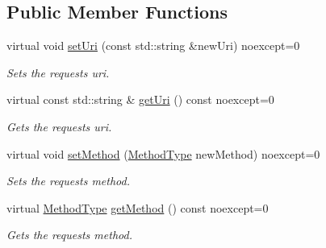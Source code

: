 \subsection*{Public Member Functions}
\begin{DoxyCompactItemize}
\item 
\mbox{\label{classZiApi_1_1HttpRequest_a0a6e036d520b4c43a7350f465c429b20}} 
virtual void \mbox{\hyperlink{classZiApi_1_1HttpRequest_a0a6e036d520b4c43a7350f465c429b20}{set\+Uri}} (const std\+::string \&new\+Uri) noexcept=0
\begin{DoxyCompactList}\small\item\em Sets the request\textquotesingle{}s uri. \end{DoxyCompactList}\item 
\mbox{\label{classZiApi_1_1HttpRequest_aa2830d65539c10f3441d2988eff2f3b8}} 
virtual const std\+::string \& \mbox{\hyperlink{classZiApi_1_1HttpRequest_aa2830d65539c10f3441d2988eff2f3b8}{get\+Uri}} () const noexcept=0
\begin{DoxyCompactList}\small\item\em Gets the request\textquotesingle{}s uri. \end{DoxyCompactList}\item 
\mbox{\label{classZiApi_1_1HttpRequest_a45f2f16405c9572dcd3acf70eb1a9dd1}} 
virtual void \mbox{\hyperlink{classZiApi_1_1HttpRequest_a45f2f16405c9572dcd3acf70eb1a9dd1}{set\+Method}} (\mbox{\hyperlink{classZiApi_1_1HttpRequest_a8592cff867cbbc5cc43bd3a4d6053a1b}{Method\+Type}} new\+Method) noexcept=0
\begin{DoxyCompactList}\small\item\em Sets the request\textquotesingle{}s method. \end{DoxyCompactList}\item 
\mbox{\label{classZiApi_1_1HttpRequest_a783653b01833477dd2ce7a9d6ba306c6}} 
virtual \mbox{\hyperlink{classZiApi_1_1HttpRequest_a8592cff867cbbc5cc43bd3a4d6053a1b}{Method\+Type}} \mbox{\hyperlink{classZiApi_1_1HttpRequest_a783653b01833477dd2ce7a9d6ba306c6}{get\+Method}} () const noexcept=0
\begin{DoxyCompactList}\small\item\em Gets the request\textquotesingle{}s method. \end{DoxyCompactList}\end{DoxyCompactItemize}
